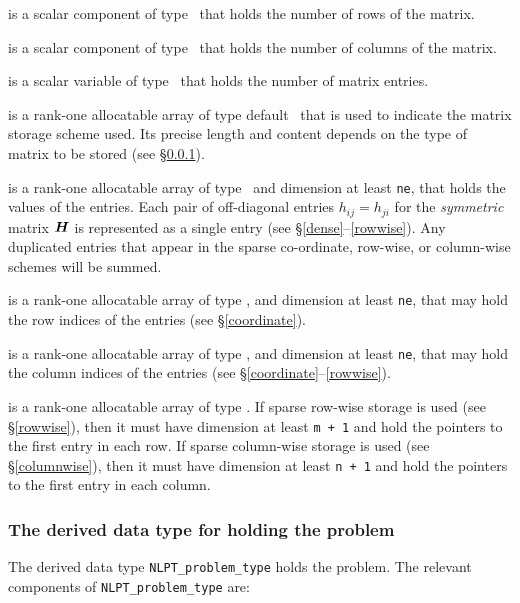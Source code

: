 \documentclass{galahad}
\begin{document}
\begin{description}

 is a scalar component of type \integer\ 
that holds the number of rows of the matrix. 

 is a scalar component of type \integer\ 
that holds the number of columns of the matrix. 
 
 is a scalar variable of type \integer\ that
holds the number of matrix entries.

 is a rank-one allocatable array of type default \character\ that
is used to indicate the matrix storage scheme used. Its precise length and
content depends on the type of matrix to be stored (see \S\ref{typeprob}).

\ittf{val} is a rank-one allocatable array of type \realdp\, 
and dimension at least {\tt ne}, that holds the values of the entries. 
Each pair of off-diagonal entries $h_{ij} = h_{ji}$ for the {\em symmetric}
matrix ${\bm{H}}$ is represented as a single entry 
(see \S\ref{dense}--\ref{rowwise}).
Any duplicated entries that appear in the sparse 
co-ordinate, row-wise, or column-wise schemes will be summed. 

 is a rank-one allocatable array of type \integer, 
and dimension at least {\tt ne}, that may hold the row indices of the entries 
(see \S\ref{coordinate}).

 is a rank-one allocatable array of type \integer, 
and dimension at least {\tt ne}, that may hold the column indices of the entries
(see \S\ref{coordinate}--\ref{rowwise}).

 is a rank-one allocatable array of type \integer.
If sparse row-wise storage is used (see \S\ref{rowwise}), then it
must have dimension at least {\tt m + 1} and hold the pointers to
the first entry in each row.  If sparse column-wise storage is used (see \S\ref{columnwise}), then it
must have dimension at least {\tt n + 1} and hold the pointers to
the first entry in each column.   

\end{description}


\subsubsection{The derived data type for holding the problem}\label{typeprob}
The derived data type {\tt NLPT\_problem\_type} holds 
the problem. The relevant components of 
{\tt NLPT\_problem\_type} 
are:
\end{document}
